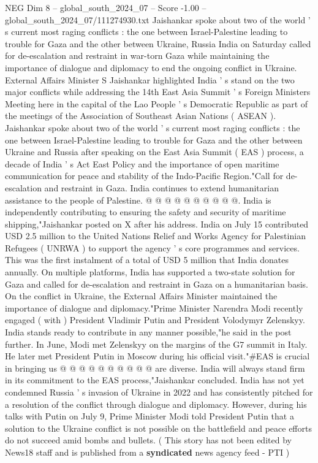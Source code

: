 \begin{textsample}{NEG Dim 8 – global\_south\_2024\_07 – Score -1.00 – global\_south\_2024\_07/111274930.txt}  \label{ex:f8_neg_115}
Jaishankar spoke about two of the world ' s current most raging conflicts : the one between Israel-Palestine leading to trouble for Gaza and the other between Ukraine, Russia India on Saturday called for de-escalation and restraint in war-torn Gaza while maintaining the importance of dialogue and diplomacy to end the ongoing conflict in Ukraine.
External Affairs Minister S Jaishankar highlighted India ' s stand on the two major conflicts while addressing the 14th East Asia Summit ' s Foreign Ministers Meeting here in the capital of the Lao People ' s Democratic Republic as part of the meetings of the Association of Southeast Asian Nations ( ASEAN ).
Jaishankar spoke about two of the world ' s current most raging conflicts : the one between Israel-Palestine leading to trouble for Gaza and the other between Ukraine and Russia after speaking on the East Asia Summit ( EAS ) process, a decade of India ' s Act East Policy and the importance of open maritime communication for peace and stability of the Indo-Pacific Region."Call for de-escalation and restraint in Gaza.
India continues to extend humanitarian assistance to the people of Palestine. @ @ @ @ @ @ @ @ @ @.
India is independently contributing to ensuring the safety and security of maritime shipping,"Jaishankar posted on X after his address.
India on July 15 contributed USD 2.5 million to the United Nations Relief and Works Agency for Palestinian Refugees ( UNRWA ) to support the agency ' s core programmes and services.
This was the first instalment of a total of USD 5 million that India donates annually.
On multiple platforms, India has supported a two-state solution for Gaza and called for de-escalation and restraint in Gaza on a humanitarian basis.
On the conflict in Ukraine, the External Affairs Minister maintained the importance of dialogue and diplomacy."Prime Minister Narendra Modi recently engaged ( with ) President Vladimir Putin and President Volodymyr Zelenskyy.
India stands ready to contribute in any manner possible,"he said in the post further.
In June, Modi met Zelenskyy on the margins of the G7 summit in Italy.
He later met President Putin in Moscow during his official visit."\#EAS is crucial in bringing us @ @ @ @ @ @ @ @ @ @ are diverse.
India will always stand firm in its commitment to the EAS process,"Jaishankar concluded.
India has not yet condemned Russia ' s invasion of Ukraine in 2022 and has consistently pitched for a resolution of the conflict through dialogue and diplomacy.
However, during his talks with Putin on July 9, Prime Minister Modi told President Putin that a solution to the Ukraine conflict is not possible on the battlefield and peace efforts do not succeed amid bombs and bullets. ( This story has not been edited by News18 staff and is published from a \textbf{syndicated} news agency feed - PTI )

\end{textsample}
